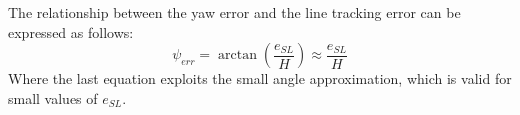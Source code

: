 The relationship between the yaw error and the line tracking error can be expressed as follows:
\begin{equation}
    \label{eq:psi_err}
    \psi_{err} = \arctan\left(\frac{e_{SL}}{H}\right) \approx \frac{e_{SL}}{H}
\end{equation}
Where the last equation exploits the small angle approximation, which is valid for small values of $e_{SL}$.